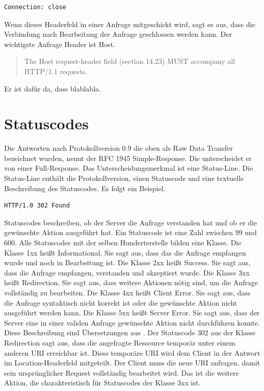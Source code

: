 \documentclass{llncs}
\begin{document}
\begin{verbatim}
Connection: close
\end{verbatim}
Wenn dieses Headerfeld in einer Anfrage mitgeschickt wird, sagt es aus, dass die Verbindung nach Bearbeitung der Anfrage geschlossen werden kann. \linebreak
Der wichtigste Anfrage Header ist Host. \begin{quote} The Host request-header field (section 14.23) MUST accompany all
   HTTP/1.1 requests. \cite{Fielding1999} \end{quote} Er ist dafür da, dass blablabla.
\section{Statuscodes}
Die Antworten nach Protokollversion 0.9 die oben als Raw Data Transfer bezeichnet wurden, nennt der RFC 1945 Simple-Response. Die unterscheidet er von einer Full-Response. Das Unterscheidungsmerkmal ist eine Status-Line. Die Status-Line enthält die Protokollversion, einen Statuscode und eine textuelle Beschreibung des Statuscodes. Es folgt ein Beispiel.
\begin{verbatim}
HTTP/1.0 302 Found
\end{verbatim}
Statuscodes beschreiben, ob der Server die Anfrage verstanden hat und ob er die gewünschte Aktion ausgeführt hat. Ein Statuscode ist eine Zahl zwischen 99 und 600. Alle Statuscodes mit der selben Hunderterstelle bilden eine Klasse.\newline
Die Klasse 1xx heißt Informational. Sie sagt aus, dass das die Anfrage empfangen wurde und noch in Bearbeitung ist.\newline
Die Klasse 2xx heißt Success. Sie sagt aus, dass die Anfrage empfangen, verstanden und akzeptiert wurde.\newline
Die Klasse 3xx heißt Redirection. Sie sagt aus, dass weitere Aktionen nötig sind, um die Anfrage vollständig zu bearbeiten.\newline
Die Klasse 4xx heißt Client Error. Sie sagt aus, dass die Anfrage syntaktisch nicht korrekt ist oder die gewünschte Aktion nicht ausgeführt werden kann.\newline
Die Klasse 5xx heißt Server Error. Sie sagt aus, dass der Server eine in einer validen Anfrage gewünschte Aktion nicht durchführen konnte. \newline
Diese Beschreibung sind Übersetzungen aus \cite{Fielding1999}. \newline
Der Statuscode 302 aus der Klasse Redirection sagt aus, dass die angefragte Ressource temporär unter einem anderen URI erreichbar ist. Diese temporäre URI wird dem Client in der Antwort im Location-Headerfeld mitgeteilt. Der Client muss die neue URI anfragen, damit sein ursprünglicher Request vollständig bearbeitet wird. Das ist die weitere Aktion, die charakteristisch für Statuscodes der Klasse 3xx ist. 
   
\end{document}
